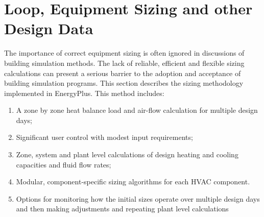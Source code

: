 \chapter{Loop, Equipment Sizing and other Design Data}\label{loop-equipment-sizing-and-other-design-data}

The importance of correct equipment sizing is often ignored in discussions of building simulation methods. The lack of reliable, efficient and flexible sizing calculations can present a serious barrier to the adoption and acceptance of building simulation programs. This section describes the sizing methodology implemented in EnergyPlus. This method includes:

\begin{enumerate}
\def\labelenumi{\arabic{enumi}.}
\item
  A zone by zone heat balance load and air-flow calculation for multiple design days;
\item
  Significant user control with modest input requirements;
\item
  Zone, system and plant level calculations of design heating and cooling capacities and fluid flow rates;
\item
  Modular, component-specific sizing algorithms for each HVAC component.
\item
  Options for monitoring how the initial sizes operate over multiple design days and then making adjustments and repeating plant level calculations
\end{enumerate}
